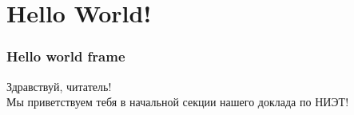 \section{Hello World!} 

\begin{frame}[t]
\frametitle{Hello world frame}
Здравствуй, читатель!\\
Мы приветствуем тебя в начальной секции нашего доклада по НИЭТ!

\end{frame}
